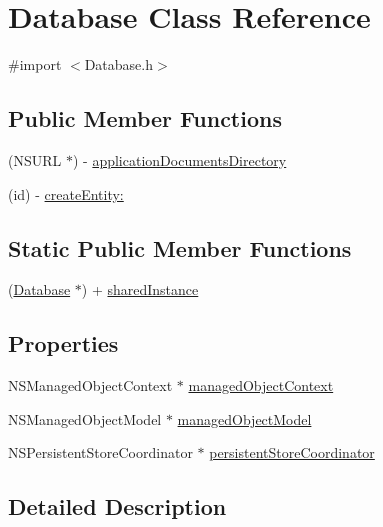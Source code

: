 \hypertarget{interface_database}{
\section{Database Class Reference}
\label{interface_database}
}


{\ttfamily \#import $<$Database.h$>$}

\subsection*{Public Member Functions}
\begin{DoxyCompactItemize}
\item 
(NSURL $\ast$) -\/ \hyperlink{interface_database_a13f63ca0981501b3ae86e9931049c2f9}{applicationDocumentsDirectory}
\item 
(id) -\/ \hyperlink{interface_database_a65bc495f9aa1e5b6f8d4343f5d48efc4}{createEntity:}
\end{DoxyCompactItemize}
\subsection*{Static Public Member Functions}
\begin{DoxyCompactItemize}
\item 
(\hyperlink{interface_database}{Database} $\ast$) + \hyperlink{interface_database_af9f8fecabcb05202b4e4127f577c0a49}{sharedInstance}
\end{DoxyCompactItemize}
\subsection*{Properties}
\begin{DoxyCompactItemize}
\item 
NSManagedObjectContext $\ast$ \hyperlink{interface_database_af5d2f65acff5f2c9e7e4ad472f38dfff}{managedObjectContext}
\item 
NSManagedObjectModel $\ast$ \hyperlink{interface_database_a688e19e1a5eeabf38cb33bc0e0630950}{managedObjectModel}
\item 
NSPersistentStoreCoordinator $\ast$ \hyperlink{interface_database_a11b8c3b6ec8fa5f88cd057beec16a166}{persistentStoreCoordinator}
\end{DoxyCompactItemize}


\subsection{Detailed Description}



